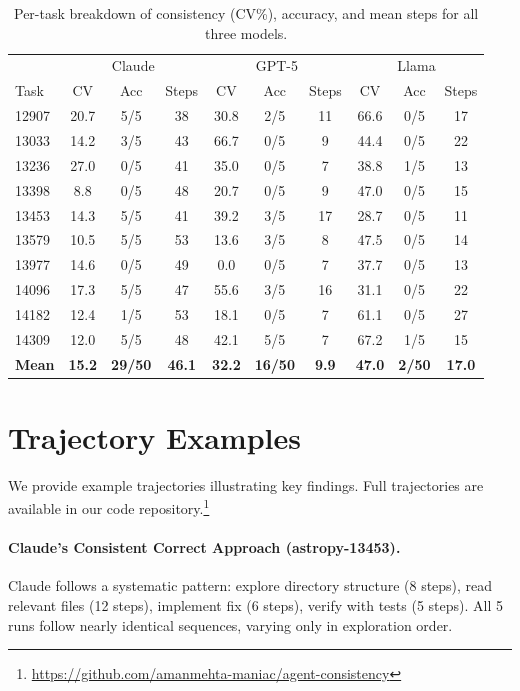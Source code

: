 \documentclass{article}
\begin{document}
\begin{table}[!t]
\centering
\caption{Per-task breakdown of consistency (CV\%), accuracy, and mean steps for all three models.}
\label{tab:pertask}
\vskip 0.1in
\begin{small}
\begin{tabular}{l|ccc|ccc|ccc}
\toprule
 & \multicolumn{3}{c|}{Claude} & \multicolumn{3}{c|}{GPT-5} & \multicolumn{3}{c}{Llama} \\
Task & CV & Acc & Steps & CV & Acc & Steps & CV & Acc & Steps \\
\midrule
12907 & 20.7 & 5/5 & 38 & 30.8 & 2/5 & 11 & 66.6 & 0/5 & 17 \\
13033 & 14.2 & 3/5 & 43 & 66.7 & 0/5 & 9 & 44.4 & 0/5 & 22 \\
13236 & 27.0 & 0/5 & 41 & 35.0 & 0/5 & 7 & 38.8 & 1/5 & 13 \\
13398 & 8.8 & 0/5 & 48 & 20.7 & 0/5 & 9 & 47.0 & 0/5 & 15 \\
13453 & 14.3 & 5/5 & 41 & 39.2 & 3/5 & 17 & 28.7 & 0/5 & 11 \\
13579 & 10.5 & 5/5 & 53 & 13.6 & 3/5 & 8 & 47.5 & 0/5 & 14 \\
13977 & 14.6 & 0/5 & 49 & 0.0 & 0/5 & 7 & 37.7 & 0/5 & 13 \\
14096 & 17.3 & 5/5 & 47 & 55.6 & 3/5 & 16 & 31.1 & 0/5 & 22 \\
14182 & 12.4 & 1/5 & 53 & 18.1 & 0/5 & 7 & 61.1 & 0/5 & 27 \\
14309 & 12.0 & 5/5 & 48 & 42.1 & 5/5 & 7 & 67.2 & 1/5 & 15 \\
\midrule
\textbf{Mean} & \textbf{15.2} & \textbf{29/50} & \textbf{46.1} & \textbf{32.2} & \textbf{16/50} & \textbf{9.9} & \textbf{47.0} & \textbf{2/50} & \textbf{17.0} \\
\bottomrule
\end{tabular}
\end{small}
\end{table}

\section{Trajectory Examples}
\label{app:trajectories}

We provide example trajectories illustrating key findings. Full trajectories are available in our code repository.\footnote{\url{https://github.com/amanmehta-maniac/agent-consistency}}

\paragraph{Claude's Consistent Correct Approach (astropy-13453).} Claude follows a systematic pattern: explore directory structure (8 steps), read relevant files (12 steps), implement fix (6 steps), verify with tests (5 steps). All 5 runs follow nearly identical sequences, varying only in exploration order.
\end{document}
